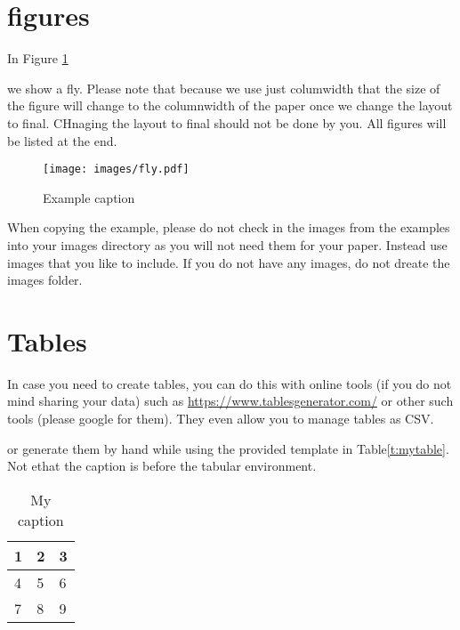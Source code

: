 \documentclass[sigconf]{acmart}
\begin{document}





\section{figures}

In Figure \ref{f:fly} 


we show a fly. Please note that because we use
just columwidth that the size of the figure will change to the
columnwidth of the paper once we change the layout to final. CHnaging
the layout to final should not be done by you. All figures will be
listed at the end.

\begin{figure}[!ht]
  \centering\texttt{[image: images/fly.pdf]}
  \caption{Example caption}\label{f:fly}
\end{figure}

When copying the example, please do not check in the images from the
examples into your images directory as you will not need them for your
paper. Instead use images that you like to include. If you do not have
any images, do not dreate the images folder.

\section{Tables}

In case you need to create tables, you can do this with online tools
(if you do not mind sharing your data) such as
\url{https://www.tablesgenerator.com/} or other such tools (please
google for them). They even allow you to manage tables as CSV.

or generate them by hand while using the provided template in Table\ref{t:mytable}. Not ethat
the caption is before the tabular environment.

\begin{table}[htb]
\centering
\caption{My caption}
\label{t:mytabble}
\begin{tabular}{lll}
1 & 2 & 3 \\
\hline
4 & 5 & 6 \\
7 & 8 & 9
\end{tabular}
\end{table}
\end{document}
